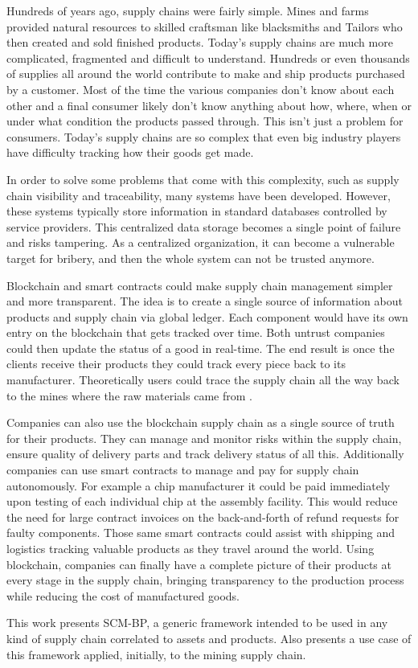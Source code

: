 
\acresetall 

Hundreds of years ago, supply chains were fairly simple. Mines and farms provided natural resources to skilled craftsman like blacksmiths and Tailors who then created and sold finished products. Today's supply chains are much more complicated, fragmented and difficult to understand. Hundreds or even thousands of supplies all around the world contribute to make and ship products purchased by a customer. Most of the time the various companies don't know about each other and a final consumer likely don't know anything about how, where, when or under what condition the products passed through. This isn't just a problem for consumers. Today's supply chains are so complex that even big industry players have difficulty tracking how their goods get made.


In order to solve some problems that come with this complexity, such as supply chain visibility and traceability, many systems have been developed. However, these systems typically store information in standard databases controlled by service providers. This centralized data storage becomes a single point of failure and risks tampering. As a centralized organization, it can become a vulnerable target for bribery, and then the whole system can not be trusted anymore.

Blockchain and smart contracts could make supply chain management simpler and more transparent. The idea is to create a single source of information about products and supply chain via global ledger. Each component would have its own entry on the blockchain that gets tracked over time. Both untrust companies could then update the status of a good in real-time. The end result is once the clients receive their products they could track every piece back to its manufacturer. Theoretically users could trace the supply chain all the way back to the mines where the raw materials came from \cite{greve2018blockchain}.

Companies can also use the blockchain supply chain as a single source of truth for their products. They can manage and monitor risks within the supply chain, ensure quality of delivery parts and track delivery status of all this. Additionally companies can use smart contracts to manage and pay for supply chain autonomously. For example a chip manufacturer it could be paid immediately upon testing of each individual chip at the assembly facility. This would reduce the need for large contract invoices on the back-and-forth of refund requests for faulty components. Those same smart contracts could assist with shipping and logistics tracking valuable products as they travel around the world. Using blockchain, companies can finally have a complete picture of their products at every stage in the supply chain, bringing transparency to the production process while reducing the cost of manufactured goods.

This work presents \acf{SCM-BP}, a generic framework intended to be used in any kind of supply chain correlated to assets and products. Also presents a use case of this framework applied, initially, to the mining supply chain.